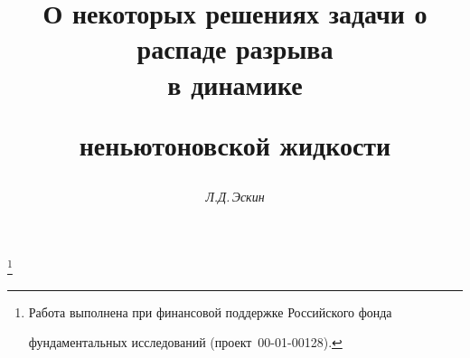 

  




\newcommand{\const}{\operatorname{const}}  


\newcommand{\sgn}{\operatorname{sgn}}  


\newcommand{\tts}[1]{}  


\renewcommand{\baselinestretch}{0.98}


  




  


\setcounter{page}{71}  












  


\author{\it Л.Д.\,Эскин}  




\title{О некоторых решениях задачи о распаде разрыва\\ в динамике  


неньютоновской жидкости}  


\thanks{Работа выполнена при финансовой поддержке Российского фонда  


фундаментальных исследований (проект \No\,00-01-00128).}  


  


\date{}  




\pagestyle{plain} %


